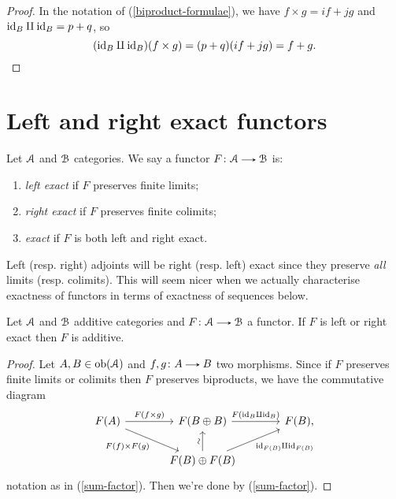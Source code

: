 \begin{proof}
  In the notation of (\ref{biproduct-formulae}), we have $f \times g =
  if + jg$ and $\mathrm{id}_B \amalg \mathrm{id}_B = p + q$, so
  \[
  (\mathrm{id}_B \amalg \mathrm{id}_B)(f \times g) = (p+q)(if+jg) = f+g. \qedhere
  \]
\end{proof}

\section{Left and right exact functors}

\begin{definition}
  \label{exactness}
  Let $\mathcal{A}$ and $\mathcal{B}$ categories. We say a functor $F \c \A \to \B$ is:
  \begin{enumerate}
  \item \emph{left exact} if $F$ preserves finite limits;
  \item \emph{right exact} if $F$ preserves finite colimits;
  \item \emph{exact} if $F$ is both left and right exact.
  \end{enumerate}
\end{definition}

\begin{example}
  Left (resp. right) adjoints will be right (resp. left) exact since
  they preserve \emph{all} limits (resp. colimits). This will seem
  nicer when we actually characterise exactness of functors in terms
  of exactness of sequences below.
\end{example}

\begin{lemma}
  \label{exact-additive}
  Let $\mathcal{A}$ and $\mathcal{B}$ additive categories and $F \c \A \to \B$ a
  functor. If $F$ is left or right exact then $F$ is additive.
\end{lemma}

\begin{proof}
  Let $A,B \in \operatorname{ob}(\mathcal{A})$ and $f,g \c A \to B$ two morphisms. Since if
  $F$ preserves finite limits or colimits then $F$ preserves
  biproducts, we have the commutative diagram
  \[
  \begin{tikzcd}[column sep = large]
    F(A) \rar{F(f \times g)} \ar{dr}[swap]{F(f) \times F(g)} & F(B
    \oplus B) \rar{F(\id_B \amalg \id_B)} & F(B), \\ & F(B) \oplus
    F(B) \ar{u}[anchor=center,rotate=90,yshift=3pt]{\sim}
    \ar{ur}[swap]{\id_{F(B)} \amalg \id_{F(B)}} &
  \end{tikzcd}
  \]
  notation as in (\ref{sum-factor}). Then we're done by
  (\ref{sum-factor}).
\end{proof}

